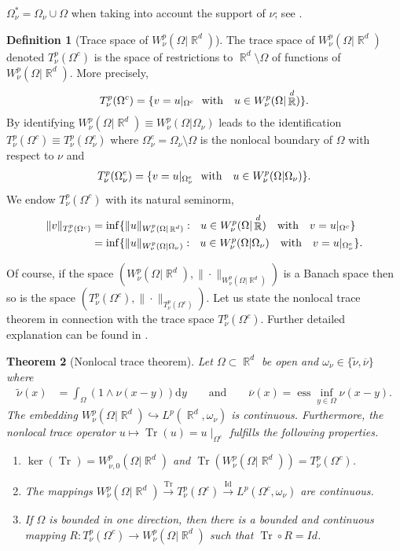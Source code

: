 \documentclass[12pt, reqno]{amsart}%
\theoremstyle{plain}  %
\newtheorem{theorem}{Theorem}[section]
\theoremstyle{definition}  %
\newtheorem{definition}[theorem]{Definition}
\numberwithin{equation}{section}
\DeclareMathOperator{\R}{\mathbb{R}}
\renewcommand{\d}{\mathrm{d}}
\newcommand{\WnuOmR}{W^{p}_{\nu}(\Omega|\R^d )}
\newcommand{\WnuOmRO}{W_{\nu,0}^{p}(\Omega|\R^d )}%
\newcommand{\TnuOm}{T^{p}_{\nu} (\Omega^c)}
\begin{document}
$\Omega_\nu^{*} =\Omega_\nu\cup\Omega$ when taking into account the support of $\nu$; see \cite{Fog25}.
\begin{definition}[Trace space of $\WnuOmR$]
The trace space of $\WnuOmR$ denoted  $\TnuOm$ is the space of restrictions to $\R^d\setminus \Omega$ of functions of $\WnuOmR$. More precisely,
%
\begin{align*}
\TnuOm = \{ v = u|_{\Omega^c} ~~\hbox{with }~~ u \in \WnuOmR\}.
\end{align*}
By  identifying  $\WnuOmR\equiv W^p_\nu(\Omega|\Omega_\nu)$ leads to the identification $\TnuOm\equiv T^p_\nu(\Omega_{\nu}^e)$ where $\Omega_{\nu}^e=\Omega_\nu\setminus\Omega$  is the nonlocal boundary of $\Omega$ with respect to $\nu$ and
\begin{align*}
T^p_\nu(\Omega_{\nu}^e)
= \{ v = u|_{\Omega_{\nu}^e} ~~\hbox{with }~~ u \in W^p_\nu(\Omega|\Omega_\nu)\}.
\end{align*}
We endow $\TnuOm $ with its natural seminorm,
%
\begin{align*}
\|v\|_{\TnuOm } &= \inf\{ \|u\|_{\WnuOmR }: ~~ u \in \WnuOmR ~~ \hbox{ with }~~ v = u|_{\Omega^c} \}\\
&= \inf\{ \|u\|_{W^p_\nu(\Omega|\Omega_\nu) }: ~~ u \in W^p_\nu(\Omega|\Omega_\nu)~~ \hbox{ with }~~ v = u|_{\Omega^e_{\nu}}\}.
\end{align*}
\end{definition}
\noindent Of course, if the space $(\WnuOmR, \|\cdot\|_{\WnuOmR})$	is a Banach space then so is the space $(\TnuOm,  \|\cdot\|_{\TnuOm})$.  Let us state the nonlocal trace theorem in connection with the trace space $\TnuOm$. Further detailed explanation can be found in \cite{Fog25,FoKa24}.
\begin{theorem}[Nonlocal trace theorem]\label{thm:trace-nonloc-thm}
Let $\Omega\subset \R^d$ be open and  $\omega_\nu \in \{\widetilde{\nu}, \overline{\nu}\}$ where
\begin{align*}
\widetilde{\nu}(x)&=\int_{\Omega}(1\land\nu(x-y)) \d y
\qquad\text{and}\qquad \overline{\nu}(x)= \operatorname{ess}\inf_{y\in \Omega}\nu(x-y).
\end{align*}
The embedding $\WnuOmR\hookrightarrow L^p(\R^d,\omega_\nu)$ is continuous. Furthermore, the nonlocal trace operator $u \mapsto \operatorname{Tr}(u) = u\mid_{\Omega^c}$ fulfills the following properties.
\begin{enumerate}[$(a)$]
\item $ \ker(\operatorname{Tr} ) = \WnuOmRO$ and $\operatorname{Tr}(\WnuOmR)= \TnuOm$.
\item The mappings $\WnuOmR \xrightarrow{\operatorname{Tr}}\TnuOm\xrightarrow{\operatorname{Id}} L^p(\Omega^c,\omega_\nu)$
are continuous.
\item If $\Omega$ is bounded in one direction, then there is a bounded and continuous mapping $R: \TnuOm\to \WnuOmR$ such that $ \operatorname{Tr}\circ R= Id$.
\end{enumerate}
\end{theorem}
\end{document}
